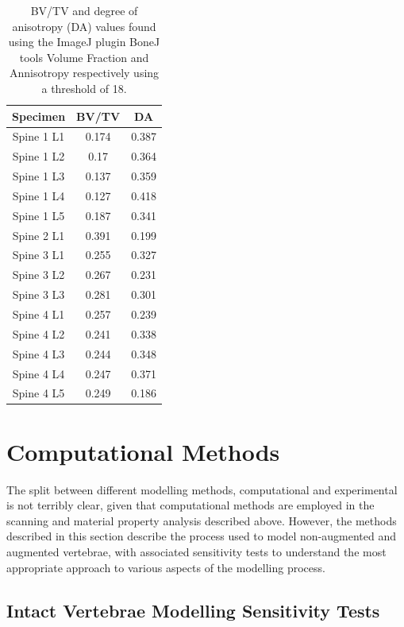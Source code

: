 \begin{table}[ht!]
	\caption{BV/TV and degree of anisotropy (DA) values found using the ImageJ
    plugin BoneJ tools Volume Fraction and Annisotropy respectively using a
    threshold of 18.}
	\label{tab:bv_tv_anis}
	\centering
	\begin{tabular}{c|c|c}
    Specimen                       & BV/TV & DA\\ \hline \hline
    Spine 1 L1  & 0.174 & 0.387 \\
    Spine 1 L2  & 0.17  & 0.364\\
    Spine 1 L3  & 0.137 & 0.359\\
    Spine 1 L4  & 0.127 & 0.418\\
    Spine 1 L5  & 0.187 & 0.341\\
    Spine 2 L1  & 0.391 & 0.199\\
    Spine 3 L1  & 0.255 & 0.327\\
    Spine 3 L2  & 0.267 & 0.231\\
    Spine 3 L3  & 0.281 & 0.301\\
    Spine 4 L1  & 0.257 & 0.239\\
    Spine 4 L2  & 0.241 & 0.338\\
    Spine 4 L3  & 0.244 & 0.348\\
    Spine 4 L4  & 0.247 & 0.371\\
    Spine 4 L5  & 0.249 & 0.186\\
    \hline
	\end{tabular}
\end{table}


\section{Computational Methods}

The split between different modelling methods, computational and experimental is not terribly clear, given that computational methods are employed in the scanning and material property analysis described above.
However, the methods described in this section describe the process used to model non-augmented and augmented vertebrae, with associated sensitivity tests to understand the most appropriate approach to various aspects of the modelling process.

\subsection{Intact Vertebrae Modelling Sensitivity Tests}

